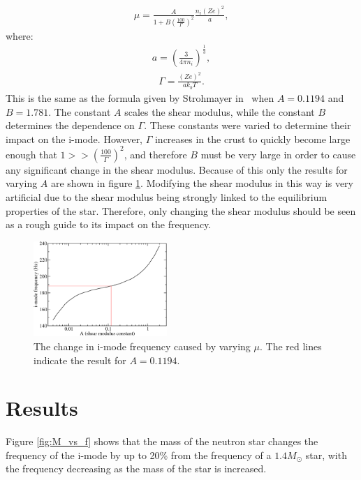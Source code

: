 \documentclass[fleqn,usenatbib]{mnras}
\begin{document}
\begin{align}
\mu=\frac{A}{1+B\left(\frac{100}{\Gamma}\right)^2}\frac{n_i\left(Ze\right)^2}{a},
\label{eq:varymu}
\end{align}
\noindent where:
\begin{align}
a=\left(\frac{3}{4\pi n_i}\right)^{\frac{1}{3}},
\label{eq:mu1991a}
\end{align}
\begin{align}
\Gamma=\frac{\left(Ze\right)^2}{ak_bT}.
\label{eq:mu1991gamma}
\end{align}
\noindent This is the same as the formula given by Strohmayer in~\cite{strohmayer1991shear} when $A=0.1194$ and $B=1.781$. The constant $A$ scales the shear modulus, while the constant $B$ determines the dependence on $\Gamma$. These constants were varied to determine their impact on the i-mode. However, $\Gamma$ increases in the crust to quickly become large enough that $1>>\left(\frac{100}{\Gamma}\right)^2$, and therefore $B$ must be very large in order to cause any significant change in the shear modulus. Because of this only the results for varying $A$ are shown in figure \ref{fig:mu_A}. Modifying the shear modulus in this way is very artificial due to the shear modulus being strongly linked to the equilibrium properties of the star. Therefore, only changing the shear modulus should be seen as a rough guide to its impact on the frequency.

\begin{figure}
\centering
\includegraphics[width=0.45\textwidth,angle=0]{shear_mod_vs_freq}
\caption{The change in i-mode frequency caused by varying $\mu$. The red lines indicate the result for $A=0.1194$.}
\label{fig:mu_A}
\end{figure}











\section{Results}
\hspace{\parindent}Figure \ref{fig:M_vs_f} shows that the mass of the neutron star changes the frequency of the i-mode by up to 20\% from the frequency of a $1.4 M_{\odot}$ star, with the frequency decreasing as the mass of the star is increased.
\end{document}
